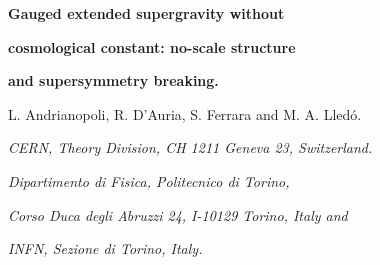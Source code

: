 \documentclass[a4paper,12pt]{article}
\begin{document}


\providecommand{\R}{\mathbb{R}}
\providecommand{\C}{\mathbb{C}}
\providecommand{\Z}{\mathbb{Z}}
\providecommand{\Hb}{\mathbb{H}}

\providecommand{\rE}{\mathrm{E}}
\providecommand{\rSp}{\mathrm{Sp}}
\providecommand{\rSO}{\mathrm{SO}}
\providecommand{\rSL}{\mathrm{SL}}
\providecommand{\rSU}{\mathrm{SU}}
\providecommand{\rUSp}{\mathrm{USp}}
\providecommand{\rU}{\mathrm{U}}
\providecommand{\rF}{\mathrm{F}}
\providecommand{\rGL}{\mathrm{GL}}
\providecommand{\rG}{\mathrm{G}}
\providecommand{\rK}{\mathrm{K}}


\providecommand{\fgl}{\mathfrak{gl}}
\providecommand{\fu}{\mathfrak{u}}
\providecommand{\fsl}{\mathfrak{sl}}
\providecommand{\fsp}{\mathfrak{sp}}
\providecommand{\fusp}{\mathfrak{usp}}
\providecommand{\fsu}{\mathfrak{su}}
\providecommand{\fp}{\mathfrak{p}}
\providecommand{\fso}{\mathfrak{so}}
\providecommand{\fl}{\mathfrak{l}}
\providecommand{\fg}{\mathfrak{g}}
\providecommand{\fr}{\mathfrak{r}}
\providecommand{\fe}{\mathfrak{e}}
\providecommand{\ft}{\mathfrak{t}}







\vskip 1cm


  \centerline{\LARGE \bf Gauged extended supergravity without }

  \bigskip

   \centerline{\LARGE \bf   cosmological constant: no-scale structure }
    \bigskip

   \centerline{\LARGE \bf   and supersymmetry breaking.}





 \vskip 1.5cm
\centerline{L. Andrianopoli\myHighlight{$^\flat$}\coordHE{}, R. D'Auria\myHighlight{$^\sharp$}\coordHE{},  S.
Ferrara\myHighlight{$^{\flat \star}$}\coordHE{} and M. A. Lled\'o\myHighlight{$^\sharp$}\coordHE{}.}

\vskip 1cm

\centerline{\it \myHighlight{$^\flat$}\coordHE{} CERN, Theory Division, CH 1211 Geneva 23,
Switzerland.}

\bigskip



\centerline{\it \myHighlight{$^\sharp$}\coordHE{} Dipartimento di Fisica, Politecnico di
Torino,} \centerline{\it Corso Duca degli Abruzzi 24, I-10129
Torino, Italy  and  } \centerline{\it   INFN, Sezione di Torino,
Italy. }
\end{document}
